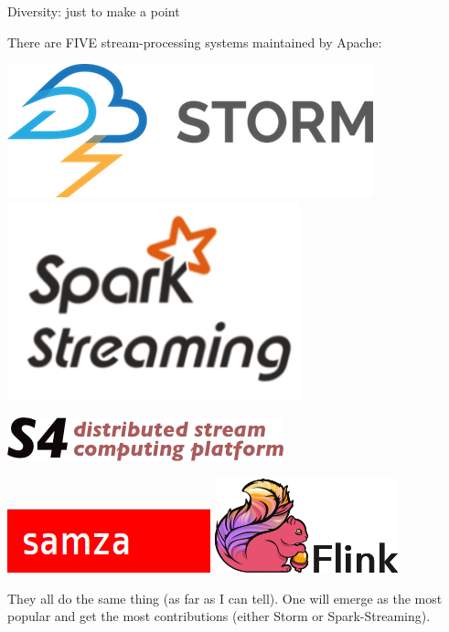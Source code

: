\documentclass{beamer}
\begin{document}
\begin{frame}{Diversity: just to make a point}

There are FIVE stream-processing systems maintained by Apache:

\begin{center}
\begin{minipage}{0.8\linewidth}
\begin{center}
\includegraphics[width=0.4\linewidth]{streaming-1.png} \hfill
\includegraphics[width=0.4\linewidth]{streaming-2.png}

\vspace{0.2 cm}
\includegraphics[width=0.5\linewidth]{streaming-3.png}

\vspace{0.2 cm}
\includegraphics[width=0.4\linewidth]{streaming-4.png} \hfill
\includegraphics[width=0.4\linewidth]{streaming-5.jpg}
\end{center}
\end{minipage}
\end{center}

\vfill
They all do the same thing (as far as I can tell). One will emerge as the most popular and get the most contributions (either Storm or Spark-Streaming).
\end{frame}
\end{document}
